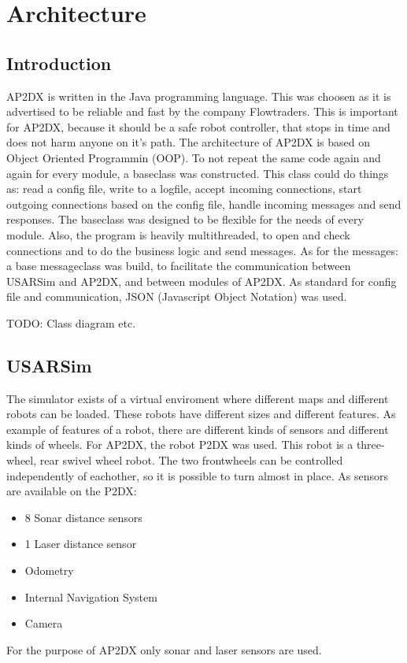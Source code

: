 \documentclass[a4paper,10pt]{article}
\begin{document}
\section{Architecture}
\subsection{Introduction}
AP2DX is written in the Java programming language. This was choosen as it is advertised to be reliable and fast by the company Flowtraders. This is important for AP2DX, because it should be a safe robot controller, that stops in time and does not harm anyone on it's path. The architecture of AP2DX is based on Object Oriented Programmin (OOP). To not repeat the same code again and again for every module, a baseclass was constructed. This class could do things as: read a config file, write to a logfile, accept incoming connections, start outgoing connections based on the config file, handle incoming messages and send responses. The baseclass was designed to be flexible for the needs of every module. Also, the program is heavily multithreaded, to open and check connections and to do the business logic and send messages. As for the messages: a base messageclass was build, to facilitate the communication between USARSim and AP2DX, and between modules of AP2DX. As standard for config file and communication, JSON (Javascript Object Notation) was used.

TODO: Class diagram etc.

\subsection{USARSim}
The simulator exists of a virtual enviroment where different maps and different robots can be loaded. These robots have different sizes and different features. As example of features of a robot, there are different kinds of sensors and different kinds of wheels. For AP2DX, the robot P2DX was used. This robot is a three-wheel, rear swivel wheel robot. The two frontwheels can be controlled independently of eachother, so it is possible to turn almost in place. As sensors are available on the P2DX:
\begin{itemize}
\item 8 Sonar distance sensors
\item 1 Laser distance sensor
\item Odometry
\item Internal Navigation System
\item Camera
\end{itemize}
For the purpose of AP2DX only sonar and laser sensors are used.
\end{document}
